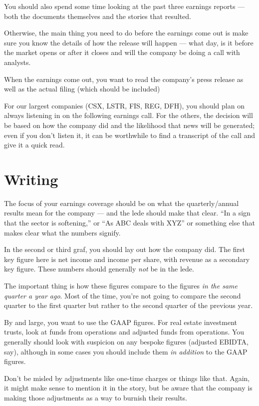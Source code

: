 \documentclass[
  11pt,
  american,
  letterpaperpaper,
  extrafontsizes,onecolumn,openright
  ]{memoir}
\begin{document}
You should also spend some time looking at the past three earnings reports --- both the documents themselves and the stories that resulted.

Otherwise, the main thing you need to do before the earnings come out is make sure you know the details of how the release will happen --- what day, is it before the market opens or after it closes and will the company be doing a call with analysts.

When the earnings come out, you want to read the company's press release as well as the actual filing (which should be included)

For our largest companies (CSX, LSTR, FIS, REG, DFH), you should plan on always listening in on the following earnings call. For the others, the decision will be based on how the company did and the likelihood that news will be generated; even if you don't listen it, it can be worthwhile to find a transcript of the call and give it a quick read.

\hypertarget{writing}{%
\section*{Writing}\label{writing}}

The focus of your earnings coverage should be on what the quarterly/annual results mean for the company --- and the lede should make that clear. \enquote{In a sign that the sector is softening,} or \enquote{As ABC deals with XYZ} or something else that makes clear what the numbers signify.

In the second or third graf, you should lay out how the company did. The first key figure here is net income and income per share, with revenue as a secondary key figure. These numbers should generally \emph{not} be in the lede.

The important thing is how these figures compare to the figures \emph{in the same quarter a year ago}. Most of the time, you're not going to compare the second quarter to the first quarter but rather to the second quarter of the previous year.

By and large, you want to use the GAAP figures. For real estate investment trusts, look at funds from operations and adjusted funds from operations. You generally should look with suspicion on any bespoke figures (adjusted EBIDTA, say), although in some cases you should include them \emph{in addition} to the GAAP figures.

Don't be misled by adjustments like one-time charges or things like that. Again, it might make sense to mention it in the story, but be aware that the company is making those adjustments as a way to burnish their results.
\end{document}
